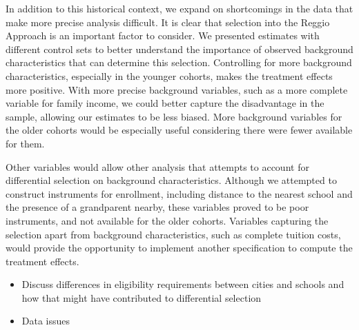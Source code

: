 In addition to this historical context, we expand on shortcomings in the data that make more precise analysis difficult. It is clear that selection into the Reggio Approach is an important factor to consider. We presented estimates with different control sets to better understand the importance of observed background characteristics that can determine this selection. Controlling for more background characteristics, especially in the younger cohorts, makes the treatment effects more positive. With more precise background variables, such as a more complete variable for family income, we could better capture the disadvantage in the sample, allowing our estimates to be less biased. More background variables for the older cohorts would be especially useful considering there were fewer available for them.


Other variables would allow other analysis that attempts to account for differential selection on background characteristics. Although we attempted to construct instruments for enrollment, including distance to the nearest school and the presence of a grandparent nearby, these variables proved to be poor instruments, and not available for the older cohorts. Variables capturing the selection apart from background characteristics, such as complete tuition costs, would provide the opportunity to implement another specification to compute the treatment effects.

\begin{itemize}
	\item Discuss differences in eligibility requirements between cities and schools and how that might have contributed to differential selection
	\item Data issues
\end{itemize}


